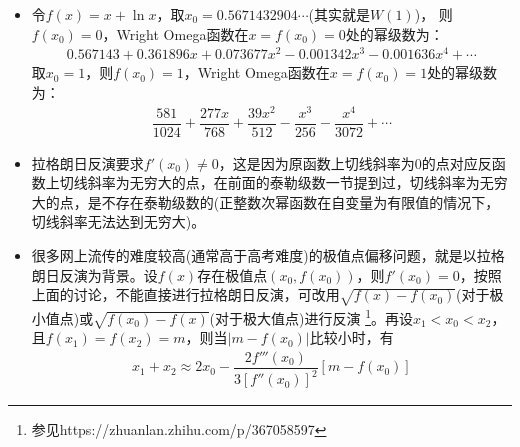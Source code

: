 \begin{itemize}[leftmargin=\inteval{\myitemleftmargin}pt,itemsep=
   \inteval{\myitemitempsep}pt,topsep=\inteval{\myitemtopsep}pt]
\item 令$ f(x)=x+\ln x $，取$ x_0=0.5671432904\cdots $(其实就是$ W(1) $)，
则$ f(x_0)=0 $，Wright Omega函数在$ x=f(x_0)=0 $处的幂级数为：
\begin{gather}\label{x+lnx拉格朗日反演x=0}
    0.567143 + 0.361896x + 0.073677x^2 - 0.001342x^3 - 0.001636x^4+\cdots
\end{gather}
取$ x_0=1 $，则$ f(x_0)=1 $，Wright Omega函数在$ x=f(x_0)=1 $处的幂级数为：
\begin{gather}\label{x+lnx拉格朗日反演x=1}
    \dfrac{581}{1024}+\dfrac{277x}{768}+\dfrac{39x^2}{512}
    -\dfrac{x^3}{256}-\dfrac{x^4}{3072}+\cdots
\end{gather}

\item 拉格朗日反演要求$ f'(x_0)\neq 0 $，这是因为原函数上切线斜率为0的点对应反函数上切线斜率为无穷大的点，在前面的泰勒级数一节提到过，切线斜率为无穷大的点，是不存在泰勒级数的(正整数次幂函数在自变量为有限值的情况下，切线斜率无法达到无穷大)。

\item 很多网上流传的难度较高(通常高于高考难度)的极值点偏移问题，就是以拉格朗日反演为背景。设$ f(x) $存在极值点$ (x_0,f(x_0)) $，则$ f'(x_0)=0 $，按照上面的讨论，不能直接进行拉格朗日反演，可改用$ \sqrt{f(x)-f(x_0)} $(对于极小值点)或$ \sqrt{f(x_0)-f(x)} $(对于极大值点)进行反演
\footnote{参见https://zhuanlan.zhihu.com/p/367058597}。再设$ x_1<x_0<x_2 $，且$ f(x_1)=f(x_2)=m $，则当$ |m-f(x_0)| $比较小时，有
\begin{gather}\label{极值点附近两根之和的估计}
    x_1+x_2\approx 2x_0-\dfrac{2f'''(x_0)}{3[f''(x_0)]^2}[m-f(x_0)]
\end{gather} 


\end{itemize}
